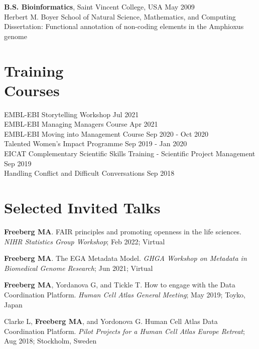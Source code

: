 \documentclass[margin,line]{res}
\begin{document}
\begin{resume}
{\bf B.S. Bioinformatics}, Saint Vincent College, USA \hfill {May 2009}\\
Herbert M. Boyer School of Natural Science, Mathematics, and Computing\\
Dissertation: Functional annotation of non-coding elements in the Amphioxus genome

\section{\sc Training\\ Courses}

EMBL-EBI Storytelling Workshop \hfill {Jul 2021}\\
EMBL-EBI Managing Managers Course \hfill {Apr 2021}\\
EMBL-EBI Moving into Management Course \hfill {Sep 2020 - Oct 2020}\\
Talented Women's Impact Programme \hfill {Sep 2019 - Jan 2020}\\
EICAT Complementary Scientific Skills Training - Scientific Project Management \hfill {Sep 2019}\\
Handling Conflict and Difficult Conversations \hfill {Sep 2018}

\section{\sc Selected Invited Talks}


{\bf Freeberg MA}. FAIR principles and promoting openness in the life sciences. {\em NIHR Statistics Group Workshop}; Feb 2022; Virtual

{\bf Freeberg MA}. The EGA Metadata Model. {\em GHGA Workshop on Metadata in Biomedical Genome Research}; Jun 2021; Virtual

{\bf Freeberg MA}, Yordanova G, and Tickle T. How to engage with the Data Coordination Platform. {\em Human Cell Atlas General Meeting}; May 2019; Toyko, Japan

Clarke L, {\bf Freeberg MA}, and Yordonova G. Human Cell Atlas Data Coordination Platform. {\em Pilot Projects for a Human Cell Atlas Europe Retreat}; Aug 2018; Stockholm, Sweden



\end{resume}
\end{document}
